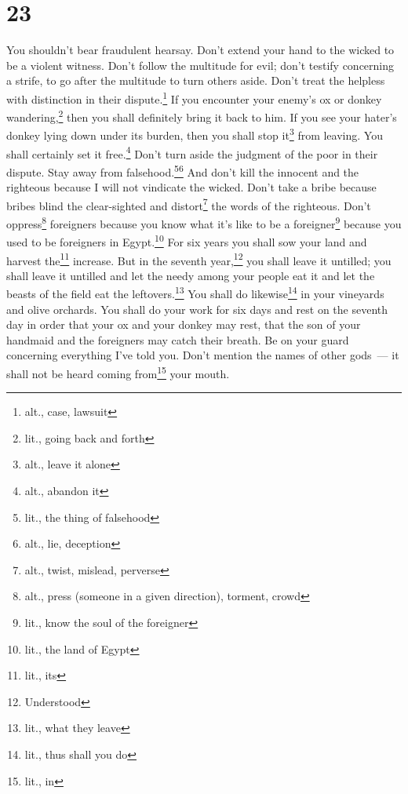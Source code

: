 \section{23}
\begin{enumerate}[align=center]
     You shouldn't bear fraudulent hearsay. Don't extend your hand to the wicked to be a violent witness.%
     Don't follow the multitude for evil; don't testify concerning a strife, to go after the multitude to turn others aside.%
     Don't treat the helpless with distinction in their dispute.\footnote{alt., case, lawsuit}%
     If you encounter your enemy's ox or donkey wandering,\footnote{lit., going back and forth} then you shall definitely bring it back to him.%
     If you see your hater's donkey lying down under its burden, then you shall stop it\footnote{alt., leave it alone} from leaving. You shall certainly set it free.\footnote{alt., abandon it}%
     Don't turn aside the judgment of the poor in their dispute.%
     Stay away from falsehood.\footnote{lit., the thing of falsehood}\footnote{alt., lie, deception} And don't kill the innocent and the righteous because I will not vindicate the wicked.%
     Don't take a bribe because bribes blind the clear-sighted and distort\footnote{alt., twist, mislead, perverse} the words of the righteous.%
     Don't oppress\footnote{alt., press (someone in a given direction), torment, crowd} foreigners because you know what it's like to be a foreigner\footnote{lit., know the soul of the foreigner} because you used to be foreigners in Egypt.\footnote{lit., the land of Egypt}%
     For six years you shall sow your land and harvest the\footnote{lit., its} increase.%
     But in the seventh year,\footnote{Understood} you shall leave it untilled; you shall leave it untilled and let the needy among your people eat it and let the beasts of the field eat the leftovers.\footnote{lit., what they leave} You shall do likewise\footnote{lit., thus shall you do} in your vineyards and olive orchards.%
     You shall do your work for six days and rest on the seventh day in order that your ox and your donkey may rest, that the son of your handmaid and the foreigners may catch their breath.%
     Be on your guard concerning everything I've told you. Don't mention the names of other gods~--- it shall not be heard coming from\footnote{lit., in} your mouth.%

\end{enumerate}
